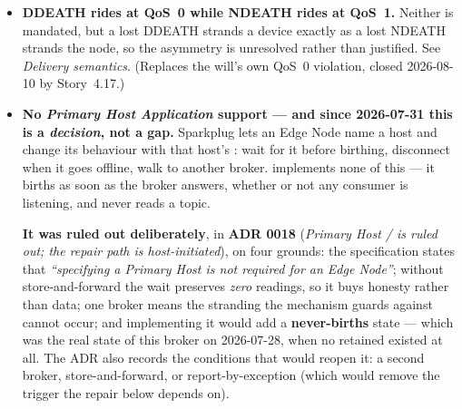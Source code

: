 \begin{itemize}
        \textbf{A \emph{retained} rebirth request is refused.} MQTT lets a publisher ask the
        broker to keep a message and replay it to everyone who subscribes afterwards. Since
        \prog subscribes on every connect, a retained rebirth request would be handed to it
        again on every reconnect, for as long as the retained message existed --- with nobody
        sending anything, and a log line indistinguishable from a real host asking. \prog
        therefore refuses a command that arrives with the retain flag set and logs it as a
        replay, naming the flag and how to clear it. This costs nothing: the specification
        requires commands to be published \emph{without} retain, so no conforming host ever
        sends one. A retained message is cleared by publishing an empty payload, retained, to
        the same topic.
  \item \textbf{DDEATH rides at QoS~0 while NDEATH rides at QoS~1.} Neither is mandated,
        but a lost DDEATH strands a device exactly as a lost NDEATH strands the node, so
        the asymmetry is unresolved rather than justified. See \emph{Delivery semantics}.
        (Replaces the will's own QoS~0 violation, closed 2026-08-10 by Story~4.17.)
  \item \textbf{No \emph{Primary Host Application} support --- and since 2026-07-31 this is
        a \emph{decision}, not a gap.} Sparkplug lets an Edge Node
        name a host and change its behaviour with that host's : wait for it
        before birthing, disconnect when it goes offline, walk to another broker. \prog
        implements none of this --- it births as soon as the broker answers, whether or
        not any consumer is listening, and never reads a  topic.

        \textbf{It was ruled out deliberately}, in \textbf{ADR 0018} (\emph{Primary Host /
         is ruled out; the repair path is host-initiated}), on four
        grounds: the specification states that \emph{``specifying a Primary Host is not
        required for an Edge Node''}; without store-and-forward the wait preserves
        \emph{zero} readings, so it buys honesty rather than data; one broker means the
        stranding the mechanism guards against cannot occur; and implementing it would add
        a \textbf{never-births} state --- which was the real state of this broker on
        2026-07-28, when no retained  existed at all. The ADR also records the
        conditions that would reopen it: a second broker, store-and-forward, or
        report-by-exception (which would remove the trigger the repair below depends on).


\end{itemize}
